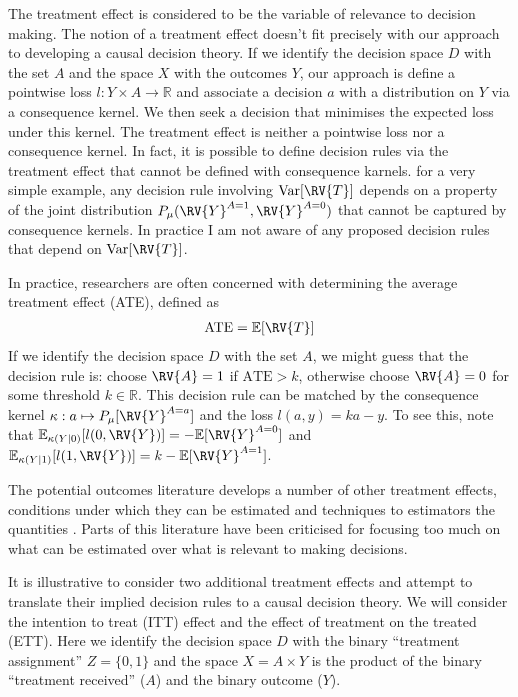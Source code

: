 The treatment effect is considered to be the variable of relevance to decision making. The notion of a treatment effect doesn't fit precisely with our approach to developing a causal decision theory. If we identify the decision space $D$ with the set $A$ and the space $X$ with the outcomes $Y$, our approach is define a pointwise loss $l:Y\times A\to \mathbb{R}$ and associate a decision $a$ with a distribution on $Y$ via a consequence kernel. We then seek a decision that minimises the expected loss under this kernel. The treatment effect is neither a pointwise loss nor a consequence kernel. In fact, it is possible to define decision rules via the treatment effect that cannot be defined with consequence karnels. for a very simple example, any decision rule involving $\text{Var}[\RV{T}]$ depends on a property of the joint distribution $P_{\mu}(\RV{Y}^{A=1}, \RV{Y}^{A=0})$ that cannot be captured by consequence kernels\cite{lattimore_learning_2017}. In practice I am not aware of any proposed decision rules that depend on $\text{Var}[\RV{T}]$.

In practice, researchers are often concerned with determining the average treatment effect (ATE), defined as 
\begin{align}
   \text{ATE}=\mathbb{E}[\RV{T}] 
\end{align}
If we identify the decision space $D$ with the set $A$, we might guess that the decision rule is: choose $\RV{A}=1$ if $\text{ATE}>k$, otherwise choose $\RV{A}=0$ for some threshold $k\in \mathbb{R}$. This decision rule can be matched by the consequence kernel $\kappa:a\mapsto P_{\mu}[\RV{Y}^{A=a}]$ and the loss $l(a,y)=ka - y$. To see this, note that $\mathbb{E}_{\kappa(Y|0)}[l(0,\RV{Y})] = -\mathbb{E}[\RV{Y}^{A=0}]$ and $\mathbb{E}_{\kappa(Y|1)}[l(1,\RV{Y})] = k-\mathbb{E}[\RV{Y}^{A=1}]$.


The potential outcomes literature develops a number of other treatment effects, conditions under which they can be estimated and techniques to estimators the quantities \cite{carneiro_evaluating_2010,imbens_identification_1994,angrist_identification_1996}. Parts of this literature have been criticised for focusing too much on what can be estimated over what is relevant to making decisions\cite{heckman_policy-relevant_2001}. 

It is illustrative to consider two additional treatment effects and attempt to translate their implied decision rules to a causal decision theory. We will consider the intention to treat (ITT) effect and the effect of treatment on the treated (ETT). Here we identify the decision space $D$ with the binary ``treatment assignment'' $Z=\{0,1\}$ and the space $X=A\times Y$ is the product of the binary ``treatment received'' ($A$) and the binary outcome ($Y$). 

